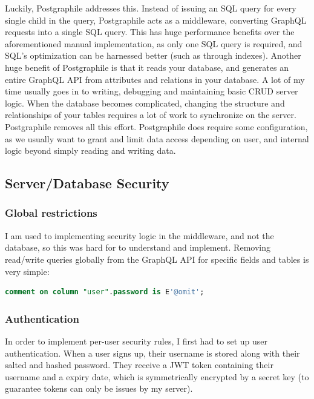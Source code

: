 \documentclass{l4proj}
\begin{document}
Luckily, Postgraphile addresses this. Instead of issuing an SQL query for every single child in the query, Postgraphile acts as a middleware, converting GraphQL requests into a single SQL query. This has huge performance benefits over the aforementioned manual implementation, as only one SQL query is required, and SQL's optimization can be harnessed better (such as through indexes). Another huge benefit of Postgraphile is that it reads your database, and generates an entire GraphQL API from attributes and relations in your database. A lot of my time usually goes in to writing, debugging and maintaining basic CRUD server logic. When the database becomes complicated, changing the structure and relationships of your tables requires a lot of work to synchronize on the server. Postgraphile removes all this effort. Postgraphile does require some configuration, as we usually want to grant and limit data access depending on user, and internal logic beyond simply reading and writing data. 


\newpage
\subsection{Server/Database Security}

\subsubsection{Global restrictions}
I am used to implementing security logic in the middleware, and not the database, so this was hard for to understand and implement. 
Removing read/write queries globally from the GraphQL API for specific fields and tables is very simple:

\begin{lstlisting}[language=SQL, caption={This comment tells Postgraphile to omit password fields} ]
comment on column "user".password is E'@omit';
\end{lstlisting}

\subsubsection{Authentication}
In order to implement per-user security rules, I first had to set up user authentication. When a user signs up, their username is stored along with their salted and hashed password. They receive a JWT token containing their username and a expiry date, which is symmetrically encrypted by a secret key (to guarantee tokens can only be issues by my server). 
\end{document}
